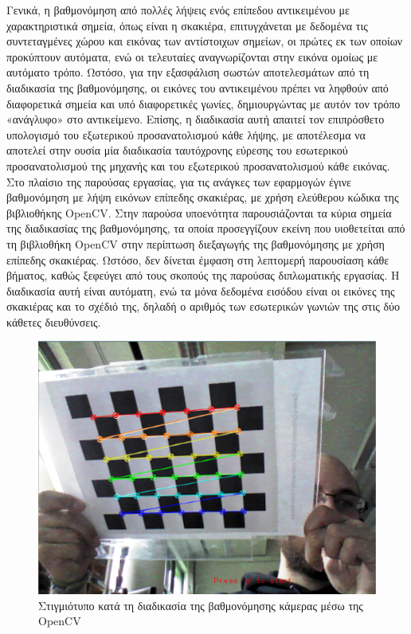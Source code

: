 Γενικά, η βαθμονόμηση από πολλές λήψεις ενός επίπεδου αντικειμένου με χαρακτηριστικά σημεία, όπως είναι η σκακιέρα, επιτυγχάνεται με δεδομένα τις συντεταγμένες χώρου και εικόνας των αντίστοιχων σημείων, οι πρώτες εκ των οποίων προκύπτουν αυτόματα, ενώ οι τελευταίες αναγνωρίζονται στην εικόνα ομοίως με αυτόματο τρόπο. Ωστόσο, για την εξασφάλιση σωστών αποτελεσμάτων από τη διαδικασία της βαθμονόμησης, οι εικόνες του αντικειμένου πρέπει να ληφθούν από διαφορετικά σημεία και υπό διαφορετικές γωνίες, δημιουργώντας με αυτόν τον τρόπο «ανάγλυφο» στο αντικείμενο. Επίσης, η διαδικασία αυτή απαιτεί τον επιπρόσθετο υπολογισμό του εξωτερικού προσανατολισμού κάθε λήψης, με αποτέλεσμα να αποτελεί στην ουσία μία διαδικασία ταυτόχρονης εύρεσης του εσωτερικού προσανατολισμού της μηχανής και του εξωτερικού προσανατολισμού κάθε εικόνας. Στο πλαίσιο της παρούσας εργασίας, για τις ανάγκες των εφαρμογών έγινε βαθμονόμηση με λήψη εικόνων επίπεδης σκακιέρας, με χρήση ελεύθερου κώδικα της βιβλιοθήκης OpenCV. Στην παρούσα υποενότητα παρουσιάζονται τα κύρια σημεία της διαδικασίας της βαθμονόμησης, τα οποία προσεγγίζουν εκείνη που υιοθετείται από τη βιβλιοθήκη OpenCV στην περίπτωση διεξαγωγής της βαθμονόμησης με χρήση επίπεδης σκακιέρας. Ωστόσο, δεν δίνεται έμφαση στη λεπτομερή παρουσίαση κάθε βήματος, καθώς ξεφεύγει από τους σκοπούς της παρούσας διπλωματικής εργασίας. Η διαδικασία αυτή είναι αυτόματη, ενώ τα μόνα δεδομένα εισόδου είναι οι εικόνες της σκακιέρας και το σχέδιό της, δηλαδή ο αριθμός των εσωτερικών γωνιών της στις δύο κάθετες διευθύνσεις.


\begin{figure}[H]
    \centering
    \includegraphics[scale=0.6, angle=0]{Files/Figures/calibration.png}
    \caption[Στιγμιότυπο κατά τη διαδικασία της βαθμονόμησης κάμερας μέσω της OpenCV]{ Στιγμιότυπο κατά τη διαδικασία της βαθμονόμησης κάμερας μέσω της OpenCV}
    \label{fig:calibration_screenshot}
\end{figure}


